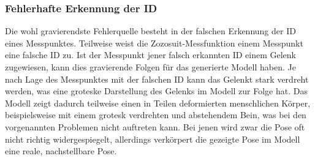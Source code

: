 \subsubsection*{Fehlerhafte Erkennung der ID}
Die wohl gravierendste Fehlerquelle besteht in der falschen Erkennung der ID eines Messpunktes. Teilweise weist die
Zozosuit-Messfunktion einem Messpunkt eine falsche ID zu. Ist der Messpunkt jener falsch erkannten ID einem 
Gelenk zugewiesen, kann dies gravierende Folgen für das generierte Modell haben. Je nach Lage des Messpunktes
mit der falschen ID kann das Gelenkt stark verdreht werden, was eine groteske Darstellung des Gelenks im Modell
zur Folge hat. Das Modell zeigt dadurch teilweise einen in Teilen deformierten menschlichen Körper,
beispielsweise mit einem grotesk verdrehten und abstehendem Bein, was bei den vorgenannten Problemen nicht auftreten kann.
Bei jenen wird zwar die Pose oft nicht richtig widergespiegelt, allerdings verkörpert die gezeigte Pose im Modell eine
reale, nachstellbare Pose.
